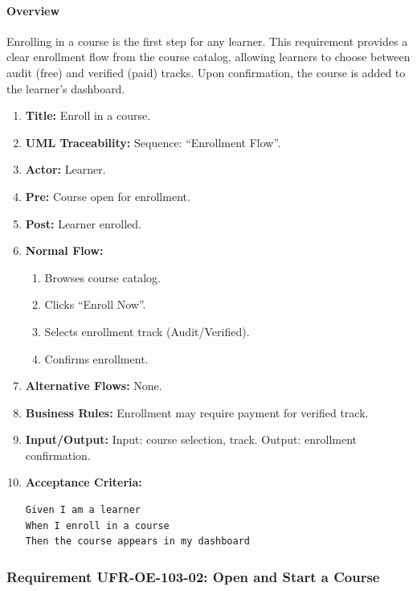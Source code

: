 \paragraph{Overview}
Enrolling in a course is the first step for any learner. This requirement provides a clear enrollment flow from the course catalog, allowing learners to choose between audit (free) and verified (paid) tracks. Upon confirmation, the course is added to the learner’s dashboard.
\begin{enumerate}[label=\textbf{\arabic*.}]
\item \textbf{Title:} Enroll in a course.
\item \textbf{UML Traceability:} Sequence: “Enrollment Flow”.
\item \textbf{Actor:} Learner.
\item \textbf{Pre:} Course open for enrollment.
\item \textbf{Post:} Learner enrolled.
\item \textbf{Normal Flow:} 
    \begin{enumerate}
        \item Browses course catalog.
        \item Clicks “Enroll Now”.
        \item Selects enrollment track (Audit/Verified).
        \item Confirms enrollment.
    \end{enumerate}
\item \textbf{Alternative Flows:} None.
\item \textbf{Business Rules:} Enrollment may require payment for verified track.
\item \textbf{Input/Output:} Input: course selection, track. Output: enrollment confirmation.
\item \textbf{Acceptance Criteria:}
    \begin{verbatim}
Given I am a learner
When I enroll in a course
Then the course appears in my dashboard
    \end{verbatim}
\end{enumerate}

\subsubsection{Requirement UFR-OE-103-02: Open and Start a Course}
